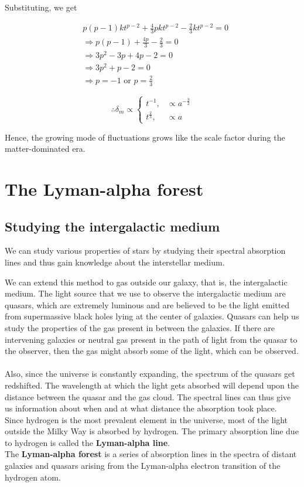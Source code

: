 \documentclass[a4,12pt,oneside]{report}
\begin{document}
	Substituting, we get
	
	\begin{align}\label{key}
	&p(p-1)kt^{p-2} + \frac{4}{3}pkt^{p-2} - \frac{2}{3}kt^{p-2} = 0 \nonumber
	\\
	&\Rightarrow p(p-1)+\frac{4p}{3} - \frac{2}{3} = 0 \nonumber
	\\
	&\Rightarrow 3p^2 - 3p + 4p -2 =0 \nonumber
	\\
	&\Rightarrow 3p^2+p-2 = 0 \nonumber
	\\
	&\Rightarrow p=-1 \text{ or } p=\frac{2}{3} \nonumber
	\end{align}
	
	\begin{equation}\label{key}
	\therefore \delta_m \propto \begin{cases}t^{-1}, &\propto a^{-\frac{3}{2}}\\
	t^{\frac{2}{3}}, &\propto a
	\end{cases}
	\end{equation}
	
	Hence, the growing mode of fluctuations grows like the scale factor during the matter-dominated era.
	
	
	
	\chapter{The Lyman-alpha forest}
	
	\section{Studying the intergalactic medium}
	We can study various properties of stars by studying their spectral absorption lines and thus gain knowledge about the interstellar medium.
	
	We can extend this method to gas outside our galaxy, that is, the intergalactic medium. The light source that we use to 
	observe the intergalactic medium are quasars, which are extremely luminous and are believed to be the light emitted from 
	supermassive black holes lying at the center of galaxies. 
	Quasars can help us study the properties of the gas present in between the galaxies.
	If there are intervening galaxies or neutral gas present in the path of light from the quasar to the observer, then the gas might absorb some of the light,
	which can be observed.
	\\ \\
	Also, since the universe is constantly expanding, the spectrum of the quasars get redshifted. The wavelength at which the light gets absorbed will depend upon the 
	distance between the quasar and the gas cloud. The spectral lines can thus give us information about when and at what distance the absorption took place. 
	\\
	Since hydrogen is the most prevalent element in the universe, most of the light outside the Milky Way is absorbed by hydrogen.
	The primary absorption line due to hydrogen is called the {\bf Lyman-alpha line}.
	\\
	The {\bf Lyman-alpha forest} is a series of absorption lines in the spectra of distant galaxies and quasars arising from the Lyman-alpha electron transition of the hydrogen atom.
\end{document}
